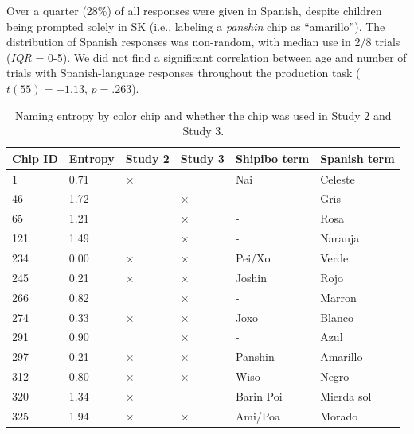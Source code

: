 \documentclass[
  english,
  ,man,floatsintext]{apa6}
\begin{document}
Over a quarter (28\%) of all responses were given in Spanish, despite children being prompted solely in SK (i.e., labeling a \emph{panshin} chip as \enquote{amarillo}). The distribution of Spanish responses was non-random, with median use in 2/8 trials (\emph{IQR} = 0-5). We did not find a significant correlation between age and number of trials with Spanish-language responses throughout the production task (\(t(55) = -1.13\), \(p = .263\)).

\begin{table}[tbp]

\begin{center}
\begin{threeparttable}

\caption{\label{tab:study1-entropy-table}Naming entropy by color chip and whether the chip was used in Study 2 and Study 3.}

\begin{tabular}{llllll}
\toprule
Chip ID & \multicolumn{1}{c}{Entropy} & \multicolumn{1}{c}{Study 2} & \multicolumn{1}{c}{Study 3} & \multicolumn{1}{c}{Shipibo term} & \multicolumn{1}{c}{Spanish term}\\
\midrule
1 & 0.71 & × &  & Nai & Celeste\\
46 & 1.72 &  & × & - & Gris\\
65 & 1.21 &  & × & - & Rosa\\
121 & 1.49 &  & × & - & Naranja\\
234 & 0.00 & × & × & Pei/Xo & Verde\\
245 & 0.21 & × & × & Joshin & Rojo\\
266 & 0.82 &  & × & - & Marron\\
274 & 0.33 & × & × & Joxo & Blanco\\
291 & 0.90 &  & × & - & Azul\\
297 & 0.21 & × & × & Panshin & Amarillo\\
312 & 0.80 & × & × & Wiso & Negro\\
320 & 1.34 & × &  & Barin Poi & Mierda sol\\
325 & 1.94 & × & × & Ami/Poa & Morado\\
\bottomrule
\end{tabular}

\end{threeparttable}
\end{center}

\end{table}
\end{document}
